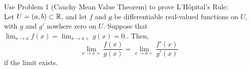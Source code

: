 \begin{problem}
  Use Problem 1 (Cauchy Mean Value Theorem) to prove
  L'H\^{o}pital's Rule: \\
  Let $U = (a, b) \subset \mathbb{R}$, and let $f$ and $g$ be differentiable
  real-valued functions on $U$, with $g$ and $g'$ nowhere zero on $U$.
  Suppose that
  $\displaystyle \lim_{x \to a} f(x) = \lim_{x \to a+} g(x) = 0$..
  Then, \[ \lim_{x \to a+} \frac{f(x)}{g(x)} = \lim_{x \to a+} \frac{f'(x)}{g'(x)} \]
  if the limit exists.
\end{problem}
\begin{answer}
  
\end{answer}
